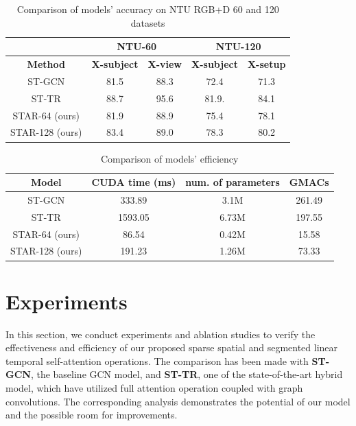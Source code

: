 \documentclass[letterpaper]{article} %
\begin{document}
\begin{table}[h!]
\centering
\begin{tabular}{ccccc}
       & \multicolumn{2}{c}{NTU-60}  & \multicolumn{2}{c}{NTU-120} \\ 
\toprule \textbf{Method} & \textbf{X-subject} & \textbf{X-view} & \textbf{X-subject} & \textbf{X-setup} \\ 
\hline
ST-GCN & 81.5 & 88.3 & 72.4& 71.3\\
ST-TR & 88.7 & 95.6 & 81.9.& 84.1\\
STAR-64 (ours) & 81.9 & 88.9 & 75.4& 78.1\\ 
STAR-128 (ours) & 83.4 & 89.0 & 78.3& 80.2\\
\hline
\end{tabular}
\caption{Comparison of models' accuracy on NTU RGB+D 60 and 120 datasets}
\label{tab:accuracy}
\end{table}

\begin{table}[!h]
\centering
\begin{tabular}{cccc}
\hline
\textbf{Model}    & \textbf{CUDA time (ms)} & \textbf{num. of parameters} & \textbf{GMACs}\\ \hline
ST-GCN   & 333.89  & 3.1M               & 261.49\\
ST-TR    & 1593.05  & 6.73M              & 197.55\\
STAR-64 (ours)  & 86.54   & 0.42M              & 15.58\\
STAR-128 (ours) & 191.23    & 1.26M             & 73.33\\ \hline
\end{tabular}
\caption{Comparison of models' efficiency}
\label{tab:efficiency}
\end{table}

\section{Experiments}
In this section, we conduct experiments and ablation studies to verify the effectiveness and efficiency of our proposed sparse spatial and segmented linear temporal self-attention operations. The comparison has been made with \textbf{ST-GCN}, the baseline GCN model, and \textbf{ST-TR}, one of the state-of-the-art hybrid model, which have utilized full attention operation coupled with graph convolutions. The corresponding analysis demonstrates the potential of our model and the possible room for improvements.
\end{document}

